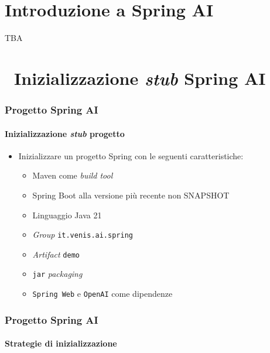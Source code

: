 \section{Introduzione a Spring AI} %
\label{sec:spring-intro}

\begin{frame}
TBA
\end{frame}

\section{\faWrench\ Inizializzazione \textit{stub} Spring AI} %
\label{sec:spring-ai-intro}

\begin{frame}[t,fragile] \frametitle{Progetto Spring AI}
    \framesubtitle{Inizializzazione \textit{stub} progetto}
    \begin{itemize}[leftmargin=10pt,align=right]
        \item[\alert{\faHandORight}] Inizializzare un progetto Spring con le seguenti caratteristiche:     
        \begin{itemize}[leftmargin=10pt,align=right]
            \item[\alert{\faHandORight}] \alert{Maven} come \textit{build tool}
            \item[\alert{\faHandORight}] Spring Boot alla versione più recente \alert{non SNAPSHOT}
            \item[\alert{\faHandORight}] Linguaggio \alert{Java 21}
            \item[\alert{\faHandORight}] \textit{Group} \alert{\texttt{it.venis.ai.spring}}
            \item[\alert{\faHandORight}] \textit{Artifact} \alert{\texttt{demo}}
            \item[\alert{\faHandORight}] \alert{\texttt{jar}} \textit{packaging}
            \item[\alert{\faHandORight}] \alert{\texttt{Spring Web}} e \alert{\texttt{OpenAI}} come dipendenze
        \end{itemize}
    \end{itemize}
\end{frame}

\begin{frame}[t,fragile] \frametitle{Progetto Spring AI}
    \framesubtitle{Strategie di inizializzazione}
	\vspace*{-.5cm}
    \begin{itemize}
    \end{itemize}
\end{frame}


